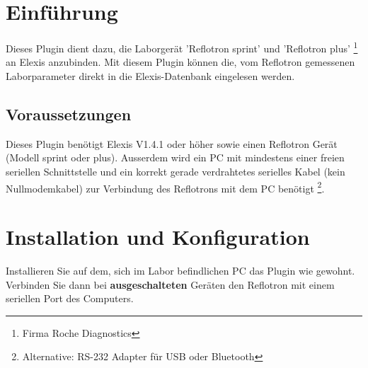 \documentclass[a4paper]{scrartcl}
\begin{document}
\section{Einf\"uhrung}
Dieses Plugin dient dazu, die Laborger\"at 'Reflotron sprint' und 'Reflotron plus' \footnote{Firma Roche Diagnostics} an Elexis anzubinden. Mit diesem Plugin k\"onnen die, vom Reflotron gemessenen Laborparameter direkt in die Elexis-Datenbank eingelesen werden.

\subsection{Voraussetzungen}
Dieses Plugin ben\"otigt Elexis V1.4.1 oder h\"oher sowie einen Reflotron Ger\"at (Modell sprint oder plus). Ausserdem wird ein PC mit mindestens einer freien seriellen Schnittstelle und ein korrekt gerade verdrahtetes serielles Kabel (kein Nullmodemkabel) zur Verbindung des Reflotrons mit dem PC ben\"otigt \footnote{Alternative: RS-232 Adapter f\"ur USB oder Bluetooth}.

\section{Installation und Konfiguration}
Installieren Sie auf dem, sich im Labor befindlichen PC das Plugin wie gewohnt. Verbinden Sie dann bei \textbf{ausgeschalteten} Ger\"aten den Reflotron mit einem seriellen Port des Computers. 
\end{document}
